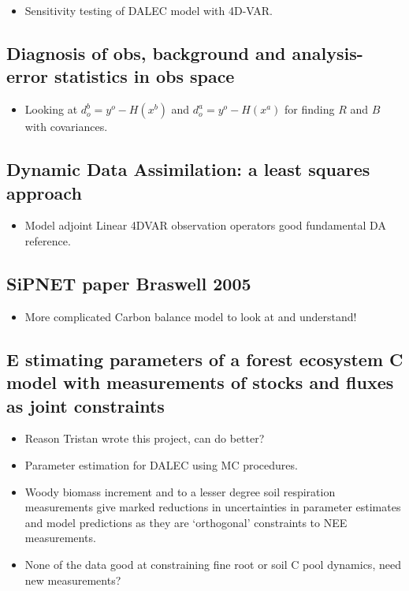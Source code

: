 \documentclass[11pt]{article}
\begin{document}
\begin{itemize}
\item Sensitivity testing of DALEC model with 4D-VAR. 
\end{itemize}

\subsection*{Diagnosis of obs, background and analysis-error statistics in obs space \cite{desroziers2005diagnosis}}

\begin{itemize}
\item Looking at $d_o^b = y^o-H(x^b)$ and $d_o^a = y^o-H(x^a)$ for finding $R$ and $B$ with covariances.
\end{itemize}

\subsection*{Dynamic Data Assimilation: a least squares approach \cite{lewis2006dynamic}}

\begin{itemize}
\item Model adjoint Linear 4DVAR observation operators good fundamental DA reference.
\end{itemize}

\subsection*{SiPNET paper Braswell 2005 \cite{braswell2005estimating}}

\begin{itemize}
\item More complicated Carbon balance model to look at and understand!
\end{itemize}


\subsection*{E                                                                                                                                                                                                stimating parameters of a forest ecosystem C model with measurements of stocks and fluxes as joint constraints \cite{richardson2010estimating}}

\begin{itemize}
\item Reason Tristan wrote this project, can do better?
\item Parameter estimation for DALEC using MC procedures.
\item Woody biomass increment and to a lesser degree soil respiration measurements give marked reductions in uncertainties in parameter estimates and model predictions as they are `orthogonal' constraints to NEE measurements.
\item None of the data good at constraining fine root or soil C pool dynamics, need new measurements? 
\end{itemize}
\end{document}
